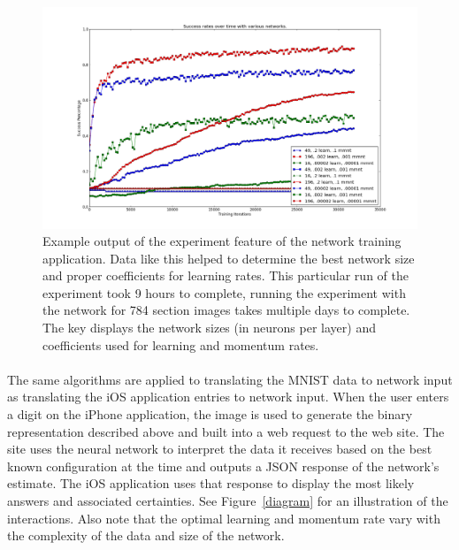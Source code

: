 \documentclass{article}
\begin{document}
    \begin{figure}
        \centering
        \includegraphics[scale=0.4]{images/experiment.png}
        \caption{Example output of the experiment feature of the network training
            application. Data like this helped to determine the best network 
            size and proper coefficients for learning rates. This particular run
            of the experiment took 9 hours to complete, running the experiment
            with the network for 784 section images takes multiple days to 
            complete. The key displays the network sizes (in neurons per layer) 
            and coefficients used for learning and momentum rates.}
        \label{experiment}
    \end{figure}

    \paragraph{}The same algorithms are applied to translating the MNIST data
    to network input as translating the iOS application entries to network input.
    When the user enters a digit on the iPhone application, the image is
    used to generate the binary representation described above and built into
    a web request to the web site. The site uses the neural network to interpret
    the data it receives based on the best known configuration at the time and
    outputs a JSON response of the network's estimate. The iOS application
    uses that response to display the most likely answers and associated
    certainties. See Figure~\ref{diagram} for an illustration of the interactions.
    Also note that the optimal learning and momentum rate vary
    with the complexity of the data and size of the network.
\end{document}
